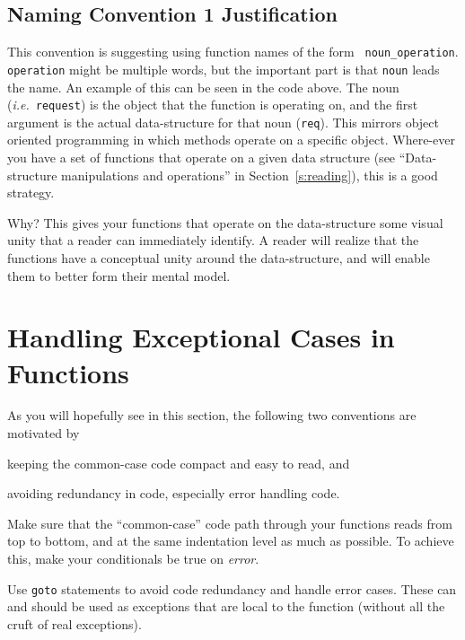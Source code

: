 \documentclass[11pt,onecolumn]{article}
\def\ie{\textit{i.e.}}
\newcommand{\head}[1]{\vspace{0.4em}\noindent{\bf #1}}
\begin{document}
\subsection{Naming Convention 1 Justification}

This convention is suggesting using function names of the form {\tt
  noun\_operation}.  {\tt operation} might be multiple words, but the
important part is that {\tt noun} leads the name.  An example of this
can be seen in the code above.  The noun (\ie\ {\tt request}) is the
object that the function is operating on, and the first argument is
the actual data-structure for that noun ({\tt req}).  This mirrors
object oriented programming %
in which methods
operate on a specific object.  Where-ever you have a set of functions
that operate on a given data structure (see ``Data-structure
manipulations and operations'' in Section~\ref{s:reading}), this is a
good strategy.

Why?  This gives your functions that operate on the data-structure
some visual unity that a reader can immediately identify.  A reader
will realize that the functions have a conceptual unity around the
data-structure, and will enable them to better form their mental
model.


\section{Handling Exceptional Cases in Functions}
\label{s:exception}

As you will hopefully see in this section, the following two
conventions are motivated by
\begin{inparaenum}[(i)]
\item keeping the common-case code compact and easy to read, and
\item avoiding redundancy in code, especially error handling code.
\end{inparaenum}

\head{Convention 1.} Make sure that the ``common-case'' code path
through your functions reads from top to bottom, and at the same
indentation level as much as possible.  To achieve this, make your
conditionals be true on {\em error}.

\head{Convention 2.} Use {\tt goto} statements to avoid code
redundancy and handle error cases.  These can and should be used as
exceptions that are local to the function (without all the cruft of
real exceptions).
\end{document}
